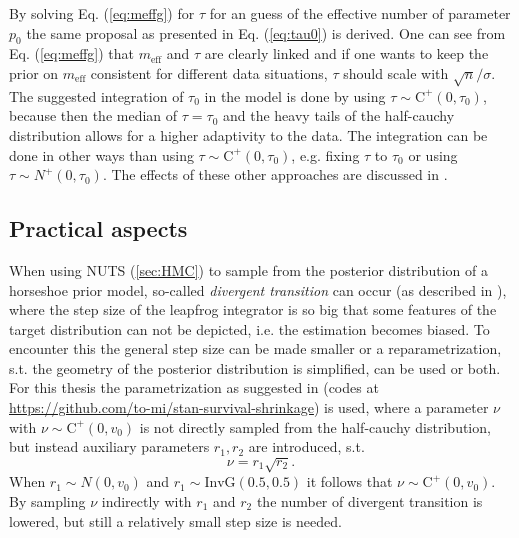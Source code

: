 \documentclass[12pt,letterpaper]{article}
\numberwithin{equation}{subsection}
\begin{document}
By solving Eq. (\ref{eq:meffg}) for $\tau$ for an guess of the effective number of parameter $p_0$ the same proposal as presented in Eq. (\ref{eq:tau0}) is derived. One can see from Eq. (\ref{eq:meffg}) that $m_{\text{eff}}$ and $\tau$ are clearly linked and if one wants to keep the prior on $m_{\text{eff}}$ consistent for different data situations, $\tau$ should scale with $\sqrt{n}/\sigma$. The suggested integration of $\tau_0$ in the model is done by using $\tau \sim \text{C}^+(0, \tau_0)$, because then the median of $\tau = \tau_0$ and the heavy tails of the half-cauchy distribution allows for a higher adaptivity to the data. The integration can be done in other ways than using $\tau \sim \text{C}^+(0,\tau_0)$, e.g. fixing $\tau$ to $\tau_0$ or using $\tau \sim N^+(0,\tau_0)$. The effects of these other approaches are discussed in \cite{horseshoe}.
\subsection{Practical aspects}
\label{sec:pract}
When using NUTS (\ref{sec:HMC}) to sample from the posterior distribution of a horseshoe prior model, so-called \textit{divergent transition} can occur (as described in \cite{paramprob}), where the step size of the leapfrog integrator is so big that some features of the target distribution can not be depicted, i.e. the estimation becomes biased. To encounter this the general step size can be made smaller or a reparametrization, s.t. the geometry of the posterior distribution is simplified, can be used or both. For this thesis the parametrization as suggested in
\cite{reparam}(codes at \url{https://github.com/to-mi/stan-survival-shrinkage}) is used, where a parameter $\nu$ with $\nu \sim \text{C}^+(0,v_0)$ is not directly sampled from the half-cauchy distribution, but instead auxiliary parameters $r_1,r_2$ are introduced, s.t. \begin{equation}
\nu = r_1 \sqrt{r_2}.
\end{equation}
When $r_1 \sim N(0,v_0)$ and $r_1 \sim \text{InvG}(0.5,0.5)$ it follows that $\nu \sim \text{C}^+(0,v_0)$. By sampling $\nu$ indirectly with $r_1$ and $r_2$ the number of divergent transition is lowered, but still a relatively small step size is needed. \\
\end{document}
